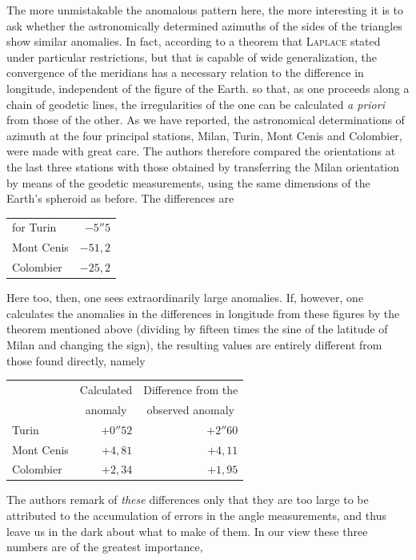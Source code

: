 %
\hspace*{\parindent}The more unmistakable the anomalous pattern here, the more interesting it is to ask whether the astronomically determined azimuths of the sides of the triangles show similar anomalies. In fact, according to a theorem that \textsc{Laplace} stated under particular restrictions, but that is capable of wide generalization, the convergence of the meridians has a necessary relation to the difference in longitude, independent of the figure of the Earth. so that, as one proceeds along a chain of geodetic lines, the irregularities of the one can be calculated \textit{a priori} from those of the other. As we have reported, the astronomical determinations of azimuth at the four principal stations, Milan, Turin, Mont Cenis and Colombier, were made with great care. The authors therefore compared the orientations at the last three stations with those obtained by transferring the Milan orientation by means of the geodetic measurements, using the same dimensions of the Earth's spheroid as before. The differences are
\begin{center}\begin{tabular}{lr}
for Turin & \(-5''5\)\\
Mont Cenis & \(-51,2\)\\
Colombier & \(-25,2\)
\end{tabular}\end{center}
Here too, then, one sees extraordinarily large anomalies. If, however, one calculates the anomalies in the differences in longitude from these figures by the theorem mentioned above (dividing by fifteen times the sine of the latitude of Milan and changing the sign), the resulting values are entirely different from those found directly, namely
\begin{center}\begin{tabular}{l|r|r}
& \multicolumn{1}{c|}{Calculated} & \multicolumn{1}{c}{Difference from the}\\
& \multicolumn{1}{c|}{anomaly} & \multicolumn{1}{c}{observed anomaly}\\
Turin & \(+0''52\) & \(+2''60\)\\
Mont Cenis & \(+4,81\) & \(+4,11\)\\
Colombier & \(+2,34\) & \(+1,95\)
\end{tabular}\end{center}
The authors remark of \textit{these} differences only that they are too large to be attributed to the accumulation of errors in the angle measurements, and thus leave us in the dark about what to make of them. In our view these three numbers are of the greatest importance,
